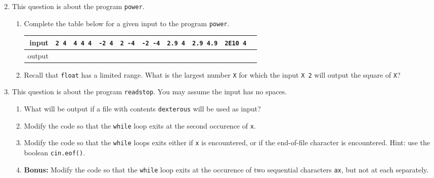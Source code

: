 \documentclass[a4paper,12pt]{article}
\begin{document}
\vfill
\begin{enumerate}
\setcounter{enumi}{1}
\item This question is about the program \texttt{power}.
\begin{enumerate}
\item Complete the table below for a given input to the program \texttt{power}.
\begin{center}
\renewcommand\arraystretch{1.5}
\begin{tabular}{|r|c|c|c|c|c|c|c|c|c|}
\hline input & \texttt{2\ 4} &  \texttt{4\ 4\ 4} & \texttt{-2\ 4} & \texttt{2\ -4} & \texttt{-2\ -4} & \texttt{2.9\ 4} & \texttt{2.9 4.9} & \texttt{2E10 4}\\
\hline output &&&&&&&& \\
\hline
\end{tabular}
\end{center}
\item Recall that \texttt{float} has a limited range. What is the largest number \texttt{X} for which the input \texttt{X 2} will output the square of \texttt{X}?
\end{enumerate}

\vfill
\item This question is about the program \texttt{readstop}. You may assume the input has no spaces.
\begin{enumerate}
\item What will be output if a file with contents \texttt{dexterous} will be used as input?
\item Modify the code so that the \texttt{while} loop exits at the second occurence of \texttt{x}.
\item Modify the code so that the \texttt{while} loops exits either if \texttt{x} is encountered, or if the end-of-file character is encountered. Hint: use the boolean \texttt{cin.eof()}.
\item \textbf{Bonus:} Modify the code so that the \texttt{while} loop exits at the occurence of two sequential characters \texttt{ax}, but not at each separately.
\end{enumerate}


\clearpage


\end{enumerate}
\end{document}
